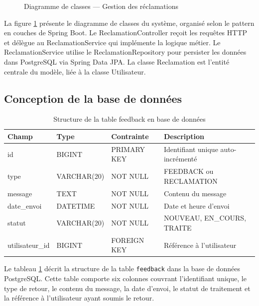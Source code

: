 \begin{figure}[H]
\caption{Diagramme de classes — Gestion des réclamations}
\label{fig:classes}
\end{figure}

La figure \ref{fig:classes} présente le diagramme de classes du système, 
organisé selon le pattern en couches de Spring Boot. Le ReclamationController 
reçoit les requêtes HTTP et délègue au ReclamationService qui implémente 
la logique métier. Le ReclamationService utilise le ReclamationRepository 
pour persister les données dans PostgreSQL via Spring Data JPA. La classe 
Reclamation est l'entité centrale du modèle, liée à la classe Utilisateur.

\subsection{Conception de la base de données}

\begin{table}[H]
\centering
\caption{Structure de la table feedback en base de données}
\label{tab:bdd}
\renewcommand{\arraystretch}{1.5}
\begin{tabular}{|p{3cm}|p{3cm}|p{2.5cm}|p{4.5cm}|}
\hline
\textbf{Champ} & \textbf{Type} & \textbf{Contrainte} & \textbf{Description} \\
\hline
id & BIGINT & PRIMARY KEY & Identifiant unique auto-incrémenté \\
\hline
type & VARCHAR(20) & NOT NULL & FEEDBACK ou RECLAMATION \\
\hline
message & TEXT & NOT NULL & Contenu du message \\
\hline
date\_envoi & DATETIME & NOT NULL & Date et heure d'envoi \\
\hline
statut & VARCHAR(20) & NOT NULL & NOUVEAU, EN\_COURS, TRAITE \\
\hline
utilisateur\_id & BIGINT & FOREIGN KEY & Référence à l'utilisateur \\
\hline
\end{tabular}
\end{table}

Le tableau \ref{tab:bdd} décrit la structure de la table \texttt{feedback} 
dans la base de données PostgreSQL. Cette table comporte six colonnes 
couvrant l'identifiant unique, le type de retour, le contenu du message, 
la date d'envoi, le statut de traitement et la référence à l'utilisateur 
ayant soumis le retour.

